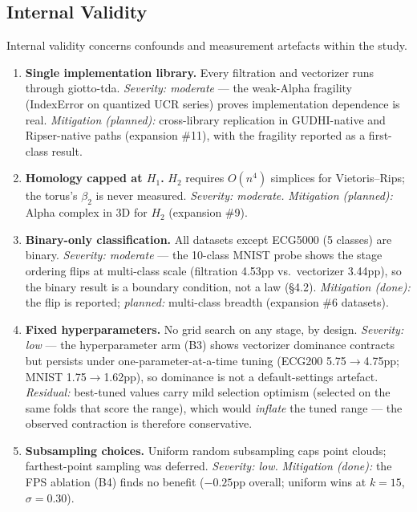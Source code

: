 \subsection{Internal Validity}
\label{sec:threats_internal}

Internal validity concerns confounds and measurement artefacts within the
study.

\begin{enumerate}
  \item \textbf{Single implementation library.} Every filtration and
    vectorizer runs through giotto-tda. \emph{Severity: moderate} --- the
    weak-Alpha fragility (IndexError on quantized UCR series) proves
    implementation dependence is real. \emph{Mitigation (planned):}
    cross-library replication in GUDHI-native and Ripser-native paths
    (expansion \#11), with the fragility reported as a first-class result.
  \item \textbf{Homology capped at $H_1$.} $H_2$ requires $O(n^4)$ simplices
    for Vietoris--Rips; the torus's $\beta_2$ is never measured.
    \emph{Severity: moderate.} \emph{Mitigation (planned):} Alpha complex in
    3D for $H_2$ (expansion \#9).
  \item \textbf{Binary-only classification.} All datasets except ECG5000
    (5 classes) are binary. \emph{Severity: moderate} --- the 10-class MNIST
    probe shows the stage ordering flips at multi-class scale (filtration
    4.53pp vs.\ vectorizer 3.44pp), so the binary result is a boundary
    condition, not a law (\S4.2). \emph{Mitigation (done):} the flip is
    reported; \emph{planned:} multi-class breadth (expansion \#6 datasets).
  \item \textbf{Fixed hyperparameters.} No grid search on any stage, by
    design. \emph{Severity: low} --- the hyperparameter arm (B3) shows
    vectorizer dominance contracts but persists under one-parameter-at-a-time
    tuning (ECG200 5.75$\rightarrow$4.75pp; MNIST 1.75$\rightarrow$1.62pp), so
    dominance is not a default-settings artefact. \emph{Residual:} best-tuned
    values carry mild selection optimism (selected on the same folds that
    score the range), which would \emph{inflate} the tuned range --- the
    observed contraction is therefore conservative.
  \item \textbf{Subsampling choices.} Uniform random subsampling caps point
    clouds; farthest-point sampling was deferred. \emph{Severity: low.}
    \emph{Mitigation (done):} the FPS ablation (B4) finds no benefit
    ($-0.25$pp overall; uniform wins at $k{=}15$, $\sigma{=}0.30$).

\end{enumerate}

